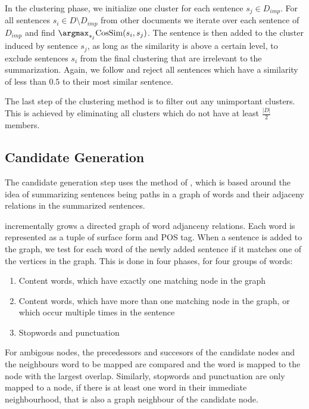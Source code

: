 \documentclass[a4paper,BCOR=10mm]{report}
\begin{document}
In the clustering phase, we initialize one cluster for each sentence $s_j \in D_{imp}$. For all sentences $s_i \in D \setminus D_{imp}$ from other documents we iterate over each sentence of $D_{imp}$ and find $\argmax_{s_j} \text{CosSim}(s_i, s_j)$. The sentence is then added to the cluster induced by sentence $s_j$, as long as the similarity is above a certain level, to exclude sentences $s_i$ from the final clustering that are irrelevant to the summarization.
Again, we follow \citeauthor{banerjee} and reject all sentences which have a similarity of less than $0.5$ to their most similar sentence.

The last step of the clustering method is to filter out any unimportant clusters. This is achieved by eliminating all clusters which do not have at least $\frac{|D|}{2}$ members.


\subsection{Candidate Generation}

The candidate generation step uses the method of \citet{fillipova}, which is based around the idea of summarizing sentences being paths in a graph of words and their adjaceny relations in the summarized sentences.

\citeauthor{fillipova} incrementally grows a directed graph of word adjanceny relations. Each word is represented as a tuple of surface form and POS tag. When a sentence is added to the graph, we test for each word of the newly added sentence if it matches one of the vertices in the graph. This is done in four phases, for four groups of words:

\begin{enumerate}
\item{Content words, which have exactly one matching node in the graph}
\item{Content words, which have more than one matching node in the graph, or which occur multiple times in the sentence}
\item{Stopwords and punctuation} %
\end{enumerate}

For ambigous nodes, the precedessors and succesors of the candidate nodes and the neighbours word to be mapped are compared and the word is mapped to the node with the largest overlap.
Similarly, stopwords and punctuation are only mapped to a node, if there is at least one word in their immediate neighbourhood, that is also a graph neighbour of the candidate node.
\end{document}
